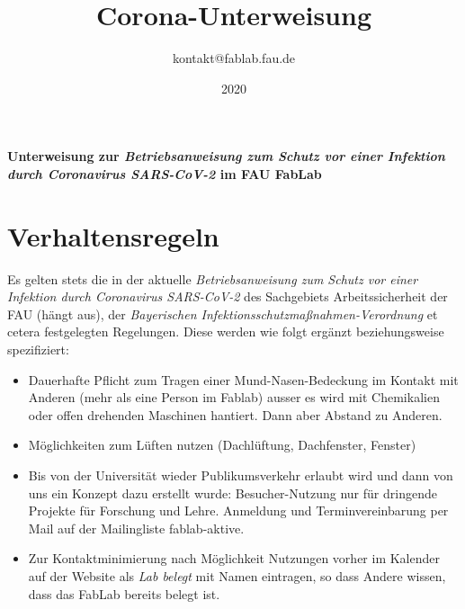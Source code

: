 \documentclass[13pt]{\basedir/fablab-document}
\date{2020}
\author{kontakt@fablab.fau.de}
\title{Corona-Unterweisung}
\begin{document}
\maketitle

\begin{center}
  \textbf{Unterweisung zur \emph{Betriebsanweisung zum Schutz vor einer Infektion durch Coronavirus SARS-CoV-2} im FAU FabLab}
\end{center}

\vbox{\vspace{1cm}}


\section{Verhaltensregeln}
Es gelten stets die in der aktuelle \emph{Betriebsanweisung zum Schutz vor einer Infektion durch Coronavirus SARS-CoV-2} des Sachgebiets Arbeitssicherheit der FAU (hängt aus), der \emph{Bayerischen Infektionsschutzmaßnahmen-Verordnung} et cetera festgelegten Regelungen. Diese werden wie folgt ergänzt beziehungsweise spezifiziert: 

\begin{itemize}
  \item  Dauerhafte Pflicht zum Tragen einer Mund-Nasen-Bedeckung im Kontakt mit Anderen (mehr als eine Person im Fablab) ausser es wird mit Chemikalien oder offen drehenden Maschinen hantiert. Dann aber Abstand zu Anderen.
  \item  Möglichkeiten zum Lüften nutzen (Dachlüftung, Dachfenster, Fenster)
  \item  Bis von der Universität wieder Publikumsverkehr erlaubt wird und dann von uns ein Konzept dazu erstellt wurde: Besucher-Nutzung nur für dringende Projekte für Forschung und Lehre. Anmeldung und Terminvereinbarung per Mail auf der Mailingliste fablab-aktive.
  \item  Zur Kontaktminimierung nach Möglichkeit Nutzungen vorher im Kalender auf der Website als \emph{Lab belegt} mit Namen eintragen, so dass Andere wissen, dass das FabLab bereits belegt ist.
\end{itemize}

\end{document}
